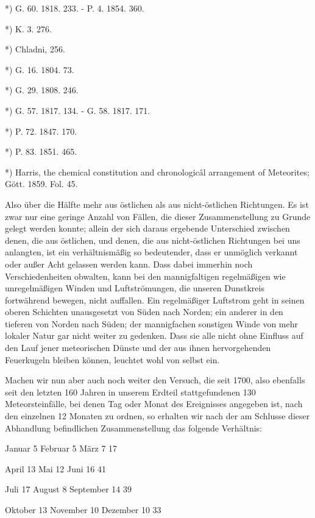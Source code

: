 \documentclass[a4paper, 8pt, oneside, polutonikogreek, german]{article}
\begin{document}
*) G. 60. 1818. 233. - P. 4. 1854. 360.

*) K. 3. 276.

*) Chladni, 256.

*) G. 16. 1804. 73.

*) G. 29. 1808. 246.

*) G. 57. 1817. 134. - G. 58. 1817. 171.

*) P. 72. 1847. 170.

*) P. 83. 1851. 465.

*) Harris, the chemical constitution and chronologicâl arrangement of Meteorites; Gött. 1859. Fol. 45.

Also über die Hälfte mehr aus östlichen als aus nicht-östlichen Richtungen. Es ist zwar nur eine geringe Anzahl von Fällen, die dieser Zusammenstellung zu Grunde gelegt werden konnte; allein der sich daraus ergebende Unterschied zwischen denen, die aus östlichen, und denen, die aus nicht-östlichen Richtungen bei uns anlangten, ist ein verhältnismäßig so bedeutender, dass er unmöglich verkannt oder außer Acht gelassen werden kann. Dass dabei immerhin noch Verschiedenheiten obwalten, kann bei den mannigfaltigen regelmäßigen wie unregelmäßigen Winden und Luftströmungen, die unseren Dunstkreis fortwährend bewegen, nicht auffallen. Ein regelmäßiger Luftstrom geht in seinen oberen Schichten unausgesetzt von Süden nach Norden; ein anderer in den tieferen von Norden nach Süden; der mannigfachen sonstigen Winde von mehr lokaler Natur gar nicht weiter zu gedenken. Dass sie alle nicht ohne Einfluss auf den Lauf jener meteorischen Dünste und der aus ihnen hervorgehenden Feuerkugeln bleiben können, leuchtet wohl von selbst ein.

Machen wir nun aber auch noch weiter den Versuch, die seit 1700, also ebenfalls seit den letzten 160 Jahren in unserem Erdteil stattgefundenen 130 Meteorsteinfälle, bei denen Tag oder Monat des Ereignisses angegeben ist, nach den einzelnen 12 Monaten zu ordnen, so erhalten wir nach der am Schlusse dieser Abhandlung befindlichen Zusammenstellung das folgende Verhältnis:

Januar 5  
Februar 5  
März 7  
17  

April 13  
Mai 12  
Juni 16  
41

Juli 17  
August 8  
September 14  
39

Oktober 13  
November 10  
Dezember 10  
33
\end{document}
